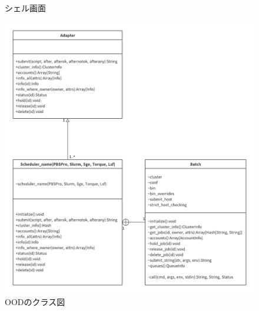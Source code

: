 \begin{figure}[t]
    \centering
    \caption{シェル画面}
    \label{shell}
\end{figure}

\begin{figure}[b]
    \centering
    \includegraphics[width=140mm]{./fig/class_diagram.png}
    \caption{OODのクラス図}
    \label{class_diagram}
\end{figure}


